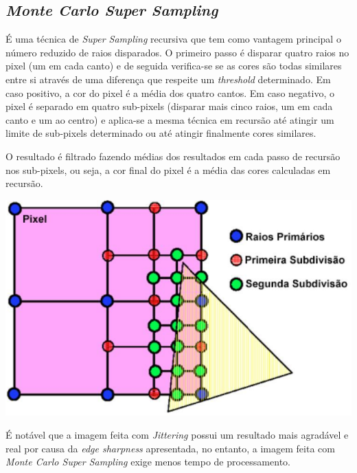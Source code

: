 \documentclass{article}
\begin{document}
        \subsection*{\textit{Monte Carlo Super Sampling}}
            \par
	É uma técnica de \textit{Super Sampling} recursiva que tem como vantagem principal o número reduzido de raios disparados. O primeiro passo é disparar quatro raios no pixel (um em cada canto) e de seguida verifica-se se as cores são todas similares entre si através de uma diferença que respeite um \textit{threshold} determinado. Em caso positivo, a cor do pixel é a média dos quatro cantos. Em caso negativo, o pixel é separado em quatro sub-pixels (disparar mais cinco raios, um em cada canto e um ao centro) e aplica-se a mesma técnica em recursão até atingir um limite de sub-pixels determinado ou até atingir finalmente cores similares. 
	\par
	O resultado é filtrado fazendo médias dos resultados em cada passo de recursão nos sub-pixels, ou seja, a cor final do pixel é a média das cores calculadas em recursão.
	\begin{center}
	\includegraphics[scale=0.40]{montecarlo}
	\end{center}

	\par
	É notável que a imagem feita com \textit{Jittering} possui um resultado mais agradável e real por causa da \textit{edge sharpness} apresentada, no entanto, a imagem feita com \textit{Monte Carlo Super Sampling} exige menos tempo de processamento.
\end{document}
